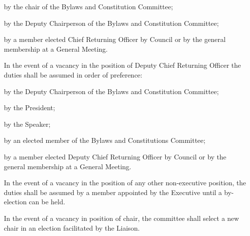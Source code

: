 \begin{longenum}[ label*=\thesubsection.\arabic*., align=left]
\begin{longenum}[ label*=\arabic*., align=left]
			\begin{longenum}[ label*=\arabic*., align=left]
				\item by the chair of the Bylaws and Constitution Committee;
				\item by the Deputy Chairperson of the Bylaws and Constitution Committee;
				\item by a member elected Chief Returning Officer by Council or by the general membership at a General Meeting.
			\end{longenum}
			\item In the event of a vacancy in the position of Deputy Chief Returning Officer the duties shall be assumed in order of preference:
			\begin{longenum}[ label*=\arabic*., align=left]
				\item by the Deputy Chairperson of the Bylaws and Constitution Committee;
				\item by the President;
				\item by the Speaker;
                \item by an elected member of the Bylaws and Constitutions Committee;
                \item by a member elected Deputy Chief Returning Officer by Council or by the general membership at a General Meeting.
			\end{longenum}
			\item In the event of a vacancy in the position of any other non-executive position, the duties shall be assumed by a member appointed by the Executive until a by-election can be held.
			\item In the event of a vacancy in position of chair, the committee shall select a new chair in an election facilitated by the Liaison.
		\end{longenum}
	\end{longenum}
